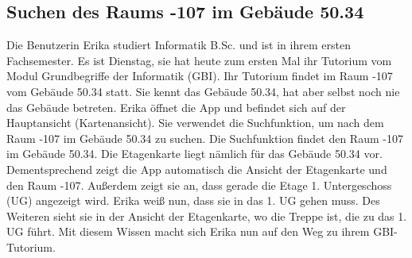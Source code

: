 \subsection{Suchen des Raums -107 im Gebäude 50.34}

Die Benutzerin Erika studiert Informatik B.Sc. und ist in ihrem ersten Fachsemester.
Es ist Dienstag, sie hat heute zum ersten Mal ihr Tutorium vom Modul Grundbegriffe der Informatik (GBI).
Ihr Tutorium findet im Raum -107 vom Gebäude 50.34 statt.
Sie kennt das Gebäude 50.34, hat aber selbst noch nie das Gebäude betreten.
Erika öffnet die App und befindet sich auf der Hauptansicht (Kartenansicht).
Sie verwendet die Suchfunktion, um nach dem Raum -107 im Gebäude 50.34 zu suchen.
Die Suchfunktion findet den Raum -107 im Gebäude 50.34.
Die Etagenkarte liegt nämlich für das Gebäude 50.34 vor.
Dementsprechend zeigt die App automatisch die Ansicht der Etagenkarte und den Raum -107.
Außerdem zeigt sie an, dass gerade die Etage 1. Untergeschoss (UG) angezeigt wird.
Erika weiß nun, dass sie in das 1. UG gehen muss.
Des Weiteren sieht sie in der Ansicht der Etagenkarte, wo die Treppe ist, die zu das 1. UG führt.
Mit diesem Wissen macht sich Erika nun auf den Weg zu ihrem GBI-Tutorium.